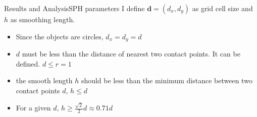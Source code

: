 \documentclass{beamer}
\begin{document}
\begin{frame}{Results and Analysis}{SPH parameters}
I define $\pmb{d}=(d_x, d_y)$ as grid cell size and $h$ as smoothing length.
\begin{itemize}
	\pause
        \item Since the objects are circles, $d_x = d_y = d $ 
	\pause
        \item $d$ must be less than the distance of nearest two contact points. It can be defined. $d \le r = 1$
	\pause
        \item the smooth length $h$ should be less than the minimum distance between two contact points $d$, $h \le d$  
        \pause
	\item For a given $d$, $h \ge \frac{\sqrt{2}}{2}d \approx 0.71 d$
\end{itemize}
\end{frame}
\end{document}
